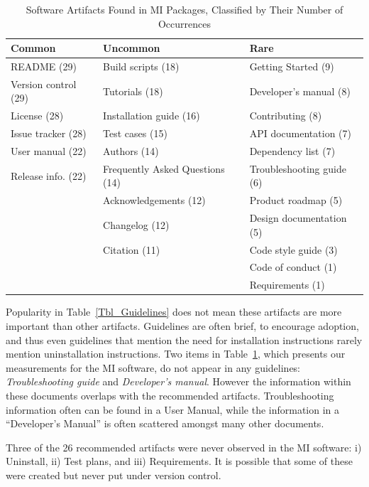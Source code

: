 \documentclass[doubleblind,12pt, 3p, times]{elsarticle}
\begin{document}
\begin{table}[ht!]
    \begin{center}
    \begin{tabular}{ p{3.8 cm} p{6.4 cm} p{4.5 cm}}
    \toprule
    Common & Uncommon & Rare \\
    \midrule
    README (29) & Build scripts (18) & Getting Started (9)\\
    Version control (29) & Tutorials (18) & Developer's manual (8)\\
    License (28) & Installation guide (16) & Contributing (8)\\
    Issue tracker (28) & Test cases (15) & API documentation (7)\\
    User manual (22) & Authors (14) & Dependency list (7)\\
    Release info. (22) & Frequently Asked Questions (14) & Troubleshooting guide (6)\\
     & Acknowledgements (12) & Product roadmap (5)\\
     & Changelog (12) & Design documentation (5)\\
     & Citation (11) & Code style guide (3)\\
     & & Code of conduct (1)\\
     & & Requirements (1)\\
    \bottomrule
    \end{tabular}
    \caption{Software Artifacts Found in MI Packages, Classified by Their Number
    of Occurrences}
    \label{artifactspresent}
    \end{center}
\end{table}

Popularity in Table~\ref{Tbl_Guidelines} does not mean these 
artifacts are more important than other artifacts. Guidelines are often brief, to
encourage adoption, and thus even guidelines that mention the need for
installation instructions rarely mention uninstallation instructions.  Two items
in Table~\ref{artifactspresent}, which presents our measurements for the MI
software, do not appear in any guidelines: \emph{Troubleshooting guide} and
\emph{Developer's manual}.  However the information within these documents
overlaps with the recommended artifacts.  Troubleshooting information often can
be found in a User Manual, while the information in a ``Developer's Manual'' is
often scattered amongst many other documents.

Three of the 26 recommended artifacts were never observed in the MI software:
i) Uninstall, ii) Test plans, and iii) Requirements. It is possible that
some of these were created but never put under version control.
\end{document}
